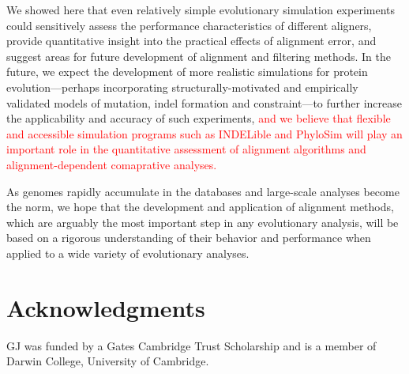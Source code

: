 \documentclass{article}
\begin{document}
We showed here that even relatively simple evolutionary simulation
experiments could sensitively assess the performance characteristics
of different aligners, provide quantitative insight into the practical
effects of alignment error, and suggest areas for future development
of alignment and filtering methods. In the future, we expect the
development of more realistic simulations for protein
evolution---perhaps incorporating structurally-motivated and
empirically validated models of mutation, indel formation and
constraint---to further increase the applicability and accuracy of
such experiments, \textcolor{red}{and we believe that flexible and
  accessible simulation programs such as INDELible
  \citep{Fletcher2009INDELible} and PhyloSim \citep{Sipos2011PhyloSim}
  will play an important role in the quantitative assessment of
  alignment algorithms and alignment-dependent comaprative analyses.}

As genomes rapidly accumulate in the databases and
large-scale analyses become the norm, we hope that the development and
application of alignment methods, which are arguably the most
important step in any evolutionary analysis, will be based on a
rigorous understanding of their behavior and performance when applied
to a wide variety of evolutionary analyses.

\section*{Acknowledgments}

GJ was funded by a Gates Cambridge Trust Scholarship and is a member
of Darwin College, University of Cambridge.

 \fontsize{9}{10}\selectfont%


\end{document}
